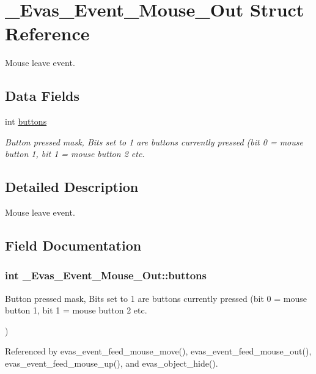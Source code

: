 \section{\_\-Evas\_\-Event\_\-Mouse\_\-Out Struct Reference}
\label{struct__Evas__Event__Mouse__Out}


Mouse leave event.  


\subsection*{Data Fields}
\begin{DoxyCompactItemize}
\item 
int \hyperlink{struct__Evas__Event__Mouse__Out_a11f204198c8faa5998c1c21f1ad55684}{buttons}
\begin{DoxyCompactList}\small\item\em Button pressed mask, Bits set to 1 are buttons currently pressed (bit 0 = mouse button 1, bit 1 = mouse button 2 etc. \item\end{DoxyCompactList}\end{DoxyCompactItemize}


\subsection{Detailed Description}
Mouse leave event. 

\subsection{Field Documentation}
\subsubsection[{buttons}]{\setlength{\rightskip}{0pt plus 5cm}int {\bf \_\-Evas\_\-Event\_\-Mouse\_\-Out::buttons}}\label{struct__Evas__Event__Mouse__Out_a11f204198c8faa5998c1c21f1ad55684}


Button pressed mask, Bits set to 1 are buttons currently pressed (bit 0 = mouse button 1, bit 1 = mouse button 2 etc. 

) 

Referenced by evas\_\-event\_\-feed\_\-mouse\_\-move(), evas\_\-event\_\-feed\_\-mouse\_\-out(), evas\_\-event\_\-feed\_\-mouse\_\-up(), and evas\_\-object\_\-hide().

